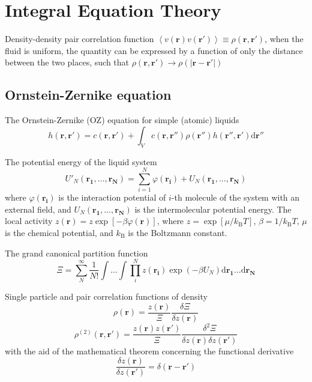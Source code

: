 
\chapter{Integral Equation Theory\label{chpt:iem}}

Density-density pair correlation function $\left\langle v(\mathbf{r})v(\mathbf{r'})\right\rangle \equiv\rho(\mathbf{r},\mathbf{r'})$,
when the fluid is uniform, the quantity can be expressed by a function
of only the distance between the two places, such that $\rho(\mathbf{r},\mathbf{r'})\rightarrow\rho(\left|\mathbf{r}-\mathbf{r'}\right|)$\citep{hirata_molecular_2004}


\section{Ornstein-Zernike equation}

The Ornstein-Zernike (OZ) equation for simple (atomic) liquids
\begin{equation}
h(\mathbf{r},\mathbf{r'})=c(\mathbf{r},\mathbf{r'})+\int_{V}c(\mathbf{r},\mathbf{r''})\rho(\mathbf{r''})h(\mathbf{r''},\mathbf{r'})\mathrm{d}\mathbf{r''}
\end{equation}


The potential energy of the liquid system
\begin{equation}
U'_{N}(\mathbf{r_{1}},\ldots,\mathbf{r_{N}})=\sum_{i=1}^{N}\varphi(\mathbf{r_{i}})+U_{N}(\mathbf{r_{1}},\ldots,\mathbf{r_{N}})
\end{equation}
where $\varphi(\mathbf{r_{i}})$ is the interaction potential of $i$-th
molecule of the system with an external field, and $U_{N}(\mathbf{r_{1}},\ldots,\mathbf{r_{N}})$
is the intermolecular potential energy. The local activity $z(\mathbf{r})=z\exp\left[-\beta\varphi(\mathbf{r})\right]$,
where $z=\exp\left[\mu/k_{\mathrm{B}}T\right]$, $\beta=1/k_{\mathrm{B}}T$,
$\mu$ is the chemical potential, and $k_{\mathrm{B}}$ is the Boltzmann
constant.

The grand canonical partition function
\begin{equation}
\Xi=\sum_{N}^{\infty}\frac{1}{N!}\int\ldots\int\prod_{i}^{N}z(\mathbf{r_{i}})\exp\left(-\beta U_{N}\right)\mathrm{d}\mathbf{r_{1}}\ldots\mathrm{d}\mathbf{r_{N}}
\end{equation}


Single particle and pair correlation functions of density
\begin{equation}
\rho(\mathbf{r})=\frac{z(\mathbf{r})}{\Xi}\frac{\delta\Xi}{\delta z(\mathbf{r})}
\end{equation}
\begin{equation}
\rho^{(2)}(\mathbf{r},\mathbf{r}')=\frac{z(\mathbf{r})z(\mathbf{r}')}{\Xi}\frac{\delta^{2}\Xi}{\delta z(\mathbf{r})\delta z(\mathbf{r}')}
\end{equation}
with the aid of the mathematical theorem concerning the functional
derivative 
\begin{equation}
\frac{\delta z(\mathbf{r})}{\delta z(\mathbf{r}')}=\delta(\mathbf{r}-\mathbf{r}')
\end{equation}


